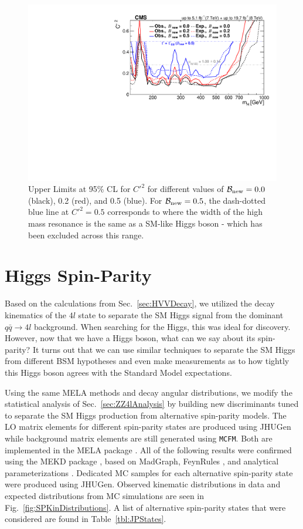 \begin{figure}[htbp]
\begin{center}
\includegraphics[width=.75\linewidth]{HiggsProperties/figures/combined_BRnewContours.pdf}
\caption[Limits on $C'^2$ for Different Values of $\mathcal{B}_{\rm{new}}$ in the EW Singlet Extension to the Standard Model]{Upper Limits at 95\% CL for $C'^2$ for different values of $\mathcal{B}_{\rm{new}} = 0.0$ (black), 0.2 (red), and 0.5 (blue). For $\mathcal{B}_{\rm{new}} = 0.5$, the dash-dotted blue line at $C'^2 = 0.5$ corresponds to where the width of the high mass resonance is the same as a SM-like Higgs boson - which has been excluded across this range.}
\label{fig:EWSExclusions}
\end{center}
\end{figure}

\section{Higgs Spin-Parity}
\label{sec:SpinParity}

Based on the calculations from Sec.~\ref{sec:HVVDecay}, we utilized the decay kinematics of the $4l$ state to separate the SM Higgs signal from the dominant $q\bar{q}\rightarrow 4l$ background. When searching for the Higgs, this was ideal for discovery. However, now that we have a Higgs boson, what can we say about its spin-parity? It turns out that we can use similar techniques to separate the SM Higgs from different BSM hypotheses and even make measurements as to how tightly this Higgs boson agrees with the Standard Model expectations.

Using the same MELA methods and decay angular distributions, we modify the statistical analysis of Sec.~\ref{sec:ZZ4lAnalysis} by building new discriminants tuned to separate the SM Higgs production from alternative spin-parity models. The LO matrix elements for different spin-parity states are produced using JHUGen while background matrix elements are still generated using {\tt MCFM}. Both are implemented in the MELA package \cite{}. All of the following results were confirmed using the MEKD package \cite{}, based on MadGraph, FeynRules \cite{}, and analytical parameterizations \cite{}. Dedicated MC samples for each alternative spin-parity state were produced using JHUGen. Observed kinematic distributions in data and expected distributions from MC simulations are seen in Fig.~\ref{fig:SPKinDistributions}. A list of alternative spin-parity states that were considered are found in Table~\ref{tbl:JPStates}.

